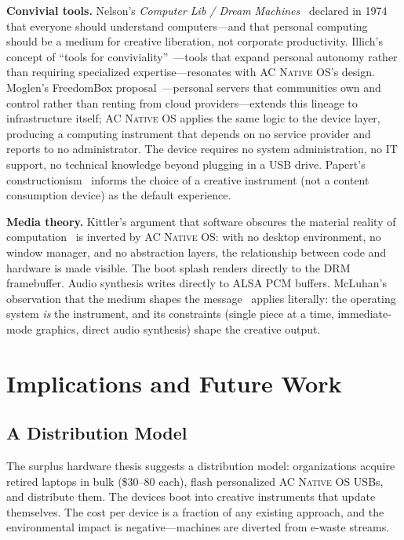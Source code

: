 \documentclass[10pt,letterpaper,twocolumn]{article}
\newcommand{\acos}{\textsc{AC Native OS}}
\begin{document}
\textbf{Convivial tools.} Nelson's \emph{Computer Lib / Dream Machines}~\citep{nelson1974computerlib} declared in 1974 that everyone should understand computers---and that personal computing should be a medium for creative liberation, not corporate productivity. Illich's concept of ``tools for conviviality''~\citep{illich1973tools}---tools that expand personal autonomy rather than requiring specialized expertise---resonates with \acos{}'s design. Moglen's FreedomBox proposal~\citep{moglen2010freedombox}---personal servers that communities own and control rather than renting from cloud providers---extends this lineage to infrastructure itself; \acos{} applies the same logic to the device layer, producing a computing instrument that depends on no service provider and reports to no administrator. The device requires no system administration, no IT support, no technical knowledge beyond plugging in a USB drive. Papert's constructionism~\citep{papert1980mindstorms} informs the choice of a creative instrument (not a content consumption device) as the default experience.

\textbf{Media theory.} Kittler's argument that software obscures the material reality of computation~\citep{kittler1995no} is inverted by \acos{}: with no desktop environment, no window manager, and no abstraction layers, the relationship between code and hardware is made visible. The boot splash renders directly to the DRM framebuffer. Audio synthesis writes directly to ALSA PCM buffers. McLuhan's observation that the medium shapes the message~\citep{mcluhan1964understanding} applies literally: the operating system \emph{is} the instrument, and its constraints (single piece at a time, immediate-mode graphics, direct audio synthesis) shape the creative output.


\section{Implications and Future Work}
\label{sec:implications}

\subsection{A Distribution Model}

The surplus hardware thesis suggests a distribution model: organizations acquire retired laptops in bulk (\$30--80 each), flash personalized \acos{} USBs, and distribute them. The devices boot into creative instruments that update themselves. The cost per device is a fraction of any existing approach, and the environmental impact is negative---machines are diverted from e-waste streams.
\end{document}
